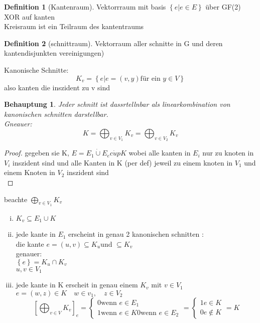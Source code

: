 \documentclass[a4paper]{article}
\newtheorem{behauptung}{Behauptung}
\theoremstyle{definition}
\newtheorem{definition}{Definition}
\theoremstyle{remark}
\begin{document}
\begin{definition}
  [Kantenraum]
  Vektorrraum mit basis $\left\{ e|e\in E \right\} $ über  GF(2)
  XOR auf kanten\\
  Kreisraum ist ein Teilraum des kantentraums\\
\end{definition}
\begin{definition}
  [schnittraum]
Vektorraum aller schnitte in G und deren kantendisjunkten vereinigungen)
\end{definition}
Kanonische Schnitte: 
\begin{equation*}
  K_v=\left\{ e|e=(v,y) \textrm{für ein  } y \in V \right\}
\end{equation*}
also kanten die inszident zu v sind
\begin{behauptung}
  Jeder schnitt ist dassrtellnbar als linearkombination von kanonischen schnitten  darstellbar. \\
  Gneauer:
  \begin{equation*}
    K=\bigoplus_{v\in V_1}K_v= \bigoplus_{v\in V_2}K_v
  \end{equation*}
\end{behauptung}
\begin{proof}
  gegeben sie K, $ E= E_1\dot{\cup}E_e\dot{cup} K$
wobei alle kanten in $E_i$ nur zu knoten in $V_i$ inszident sind und alle Kanten in K (per def) jeweil zu einem knoten in $V_1$ und einem Knoten in $V_2$ inszident sind\\

\end{proof}
beachte $ \bigoplus_{v\in V_1}K_v$ 
\begin{enumerate}[(i)]
  \item $K_v \subseteq E_1\cup K$
  \item jede kante in $E_1$ erscheint in genau 2 kanonischen schnitten :\\
    die kante  $e=(u,v)\subseteq K_u \textrm{und } \subseteq K_v$\\ genauer:
    \\
    $\left\{ e \right\}= K_u\cap K_v$\\ 
    $u,v\in V_1$
  \item jede kante in K erscheit in genau einem $K_v$ mit $v\in V_1$\\
    $e=(w,z)\in K \quad w\in v_1, \quad z\in V_2$
    \begin{equation*}
      \left[ \bigoplus_{v\in V}K_v \right]_e= 
      \begin{cases}
        0 \textrm{wenn } e\in E_1\\
	1 \textrm{wenn }e\in K
	0 \textrm{wenn }e \in E_2
      \end{cases}
      = 
      \begin{cases}
        1 e \in   K\\
	0 e\notin K
      \end{cases}
      = K
    \end{equation*}
\end{enumerate}
\end{document}

